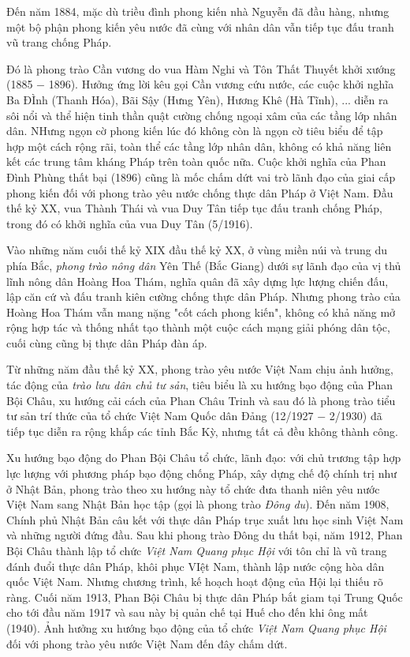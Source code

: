 Đến năm 1884, mặc dù triều đình phong kiến nhà Nguyễn đã đầu hàng, nhưng một bộ phận phong kiến yêu nước đã cùng với nhân dân vẫn tiếp tục đấu tranh vũ trang chống Pháp.

Đó là phong trào Cần vương do vua Hàm Nghi và Tôn Thất Thuyết khởi xướng (1885 $-$ 1896). Hưởng ứng lời kêu gọi Cần vương cứu nước, các cuộc khởi nghĩa Ba ĐÌnh (Thanh Hóa), Bãi Sậy (Hưng Yên), Hương Khê (Hà Tĩnh), ... diễn ra sôi nổi và thể hiện tinh thần quật cường chống ngoại xâm của các tầng lớp nhân dân. NHưng ngọn cờ phong kiến lúc đó không còn là ngọn cờ tiêu biểu để tập hợp một cách rộng rãi, toàn thể các tầng lớp nhân dân, không có khả năng liên kết các trung tâm kháng Pháp trên toàn quốc nữa. Cuộc khởi nghĩa của Phan Đình Phùng thất bại (1896) cũng là mốc chấm dứt vai trò lãnh đạo của giai cấp phong kiến đối với phong trào yêu nước chống thực dân Pháp ở Việt Nam. Đầu thế kỷ XX, vua Thành Thái và vua Duy Tân tiếp tục đấu tranh chống Pháp, trong đó có khởi nghĩa của vua Duy Tân (5/1916).

Vào những năm cuối thế kỷ XIX đầu thế kỷ XX, ở vùng miền núi và trung du phía Bắc, \textit{phong trào nông dân} Yên Thế (Bắc Giang) dưới sự lãnh đạo của vị thủ lĩnh nông dân Hoàng Hoa Thám, nghĩa quân đã xây dựng lực lượng chiến đấu, lập căn cứ và đấu tranh kiên cường chống thực dân Pháp. Nhưng phong trào của Hoàng Hoa Thám vẫn mang nặng "cốt cách phong kiến", không có khả năng mở rộng hợp tác và thống nhất tạo thành một cuộc cách mạng giải phóng dân tộc, cuối cùng cũng bị thực dân Pháp đàn áp.

Từ những năm đầu thế kỷ XX, phong trào yêu nước Việt Nam chịu ảnh hưởng, tác động của \textit{trào lưu dân chủ tư sản}, tiêu biểu là xu hướng bạo động của Phan Bội Châu, xu hướng cải cách của Phan Châu Trinh và sau đó là phong trào tiểu tư sản trí thức của tổ chức Việt Nam Quốc dân Đảng (12/1927 $-$ 2/1930) đã tiếp tục diễn ra rộng khắp các tỉnh Bắc Kỳ, nhưng tất cả đều không thành công.

Xu hướng bạo động do Phan Bội Châu tổ chức, lãnh đạo: với chủ trương tập hợp lực lượng với phương pháp bạo động chống Pháp, xây dựng chế độ chính trị như ở Nhật Bản, phong trào theo xu hướng này tổ chức đưa thanh niên yêu nước Việt Nam sang Nhật Bản học tập (gọi là phong trào \textit{Đông du}). Đến năm 1908, Chính phủ Nhật Bản câu kết với thực dân Pháp trục xuất lưu học sinh Việt Nam và những người đứng đầu. Sau khi phong trào Đông du thất bại, năm 1912, Phan Bội Châu thành lập tổ chức \textit{Việt Nam Quang phục Hội} với tôn chỉ là vũ trang đánh đuổi thực dân Pháp, khôi phục VIệt Nam, thành lập nước cộng hòa dân quốc Việt Nam. Nhưng chương trình, kế hoạch hoạt động của Hội lại thiếu rõ ràng. Cuối năm 1913, Phan Bội Châu bị thực dân Pháp bắt giam tại Trung Quốc cho tới đầu năm 1917 và sau này bị quản chế tại Huế cho đến khi ông mất (1940). Ảnh hưởng xu hướng bạo động của tổ chức \textit{Việt Nam Quang phục Hội} đối với phong trào yêu nước Việt Nam đến đây chấm dứt.

